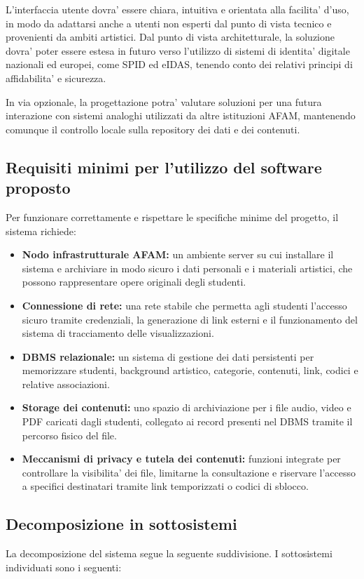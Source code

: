 \documentclass[12pt,a4paper]{article}
\begin{document}
L'interfaccia utente dovra' essere chiara, intuitiva e orientata alla facilita' d'uso, in modo da adattarsi anche a utenti non esperti dal punto di vista tecnico e provenienti da ambiti artistici. Dal punto di vista architetturale, la soluzione dovra' poter essere estesa in futuro verso l'utilizzo di sistemi di identita' digitale nazionali ed europei, come SPID ed eIDAS, tenendo conto dei relativi principi di affidabilita' e sicurezza.

In via opzionale, la progettazione potra' valutare soluzioni per una futura interazione con sistemi analoghi utilizzati da altre istituzioni AFAM, mantenendo comunque il controllo locale sulla repository dei dati e dei contenuti.

\subsection{Requisiti minimi per l'utilizzo del software proposto}
Per funzionare correttamente e rispettare le specifiche minime del progetto, il sistema richiede:

\begin{itemize}
    \item \textbf{Nodo infrastrutturale AFAM:} un ambiente server su cui installare il sistema e archiviare in modo sicuro i dati personali e i materiali artistici, che possono rappresentare opere originali degli studenti.
    \item \textbf{Connessione di rete:} una rete stabile che permetta agli studenti l'accesso sicuro tramite credenziali, la generazione di link esterni e il funzionamento del sistema di tracciamento delle visualizzazioni.
    \item \textbf{DBMS relazionale:} un sistema di gestione dei dati persistenti per memorizzare studenti, background artistico, categorie, contenuti, link, codici e relative associazioni.
    \item \textbf{Storage dei contenuti:} uno spazio di archiviazione per i file audio, video e PDF caricati dagli studenti, collegato ai record presenti nel DBMS tramite il percorso fisico del file.
    \item \textbf{Meccanismi di privacy e tutela dei contenuti:} funzioni integrate per controllare la visibilita' dei file, limitarne la consultazione e riservare l'accesso a specifici destinatari tramite link temporizzati o codici di sblocco.
\end{itemize}

\subsection{Decomposizione in sottosistemi}
La decomposizione del sistema segue la seguente suddivisione. I sottosistemi individuati sono i seguenti:
\end{document}
